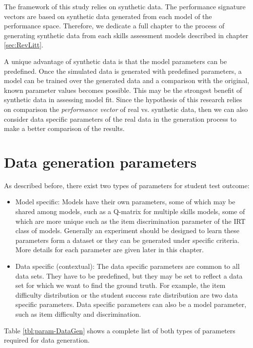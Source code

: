 \label{sec:Syn}

The framework of this study relies on synthetic data. The performance signature vectors are based on synthetic data generated from each model of the performance space.  Therefore, we dedicate a full chapter to the process of generating synthetic data from each skills assessment models described in chapter \ref{sec:RevLitt}.

A unique advantage of synthetic data is that the model parameters can be predefined. Once the simulated data is generated with predefined parameters, a model can be trained over the generated data and a comparison with the original, known parameter values becomes possible. This may be the strongest benefit of synthetic data in assessing model fit. Since the hypothesis of this research relies on comparison the \textit{performance vector} of real vs. synthetic data, then we can also consider data specific parameters of the real data in the generation process to make a better comparison of the results.

\section{Data generation parameters}

As described before, there exist two types of parameters for student test outcome:
\begin{itemize}
\item Model specific: Models have their own parameters, some of which may be shared among models, such as a Q-matrix for multiple skills models, some of which are more unique such as the item discrimination parameter of the IRT class of models. Generally an experiment should be designed to learn these parameters form a dataset or they can be generated under specific criteria. More details for each parameter are given later in this chapter.
\item Data specific (contextual): The data specific parameters are common to all data sets.  They have to be predefined, but they may be set to reflect a data set for which we want to find the ground truth.  For example, the item difficulty distribution or the student success rate distribution are two data specific parameters.  Data specific parameters can also be a model parameter, such as item difficulty and discrimination.
\end{itemize}

Table \ref{tbl:param-DataGen} shows a complete list of both types of parameters required for data generation.

